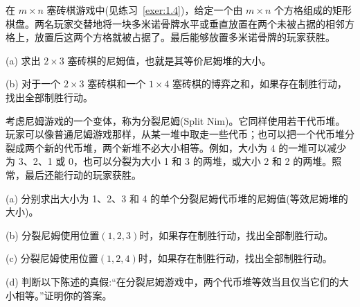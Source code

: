 \begin{exercise}\label{exer:1.11}
在 \(m \times  n\) 塞砖棋游戏中(见练习~\ref{exer:1.4})，给定一个由 \(m \times  n\) 个方格组成的矩形棋盘。两名玩家交替地将一块多米诺骨牌水平或垂直放置在两个未被占据的相邻方格上，放置后这两个方格就被占据了。最后能够放置多米诺骨牌的玩家获胜。

(a) 求出 \(2 \times  3\) 塞砖棋的尼姆值，也就是其等价尼姆堆的大小。

(b) 对于一个 \(2 \times  3\) 塞砖棋和一个 \(1 \times  4\) 塞砖棋的博弈之和，如果存在制胜行动，找出全部制胜行动。
\end{exercise}
\begin{exercise}\label{exer:1.12}
考虑尼姆游戏的一个变体，称为分裂尼姆(Split Nim)。它同样使用若干代币堆。玩家可以像普通尼姆游戏那样，从某一堆中取走一些代币；也可以把一个代币堆分裂成两个新的代币堆，两个新堆不必大小相等。例如，大小为 4 的一堆可以减少为 3、2、1 或 0，也可以分裂为大小 1 和 3 的两堆，或大小 2 和 2 的两堆。照常，最后还能行动的玩家获胜。

(a) 分别求出大小为 1、2、3 和 4 的单个分裂尼姆代币堆的尼姆值(等效尼姆堆的大小)。

(b) 分裂尼姆使用位置$(1,2,3)$时，如果存在制胜行动，找出全部制胜行动。

(c) 分裂尼姆使用位置$(1,2,4)$时，如果存在制胜行动，找出全部制胜行动。

(d) 判断以下陈述的真假:“在分裂尼姆游戏中，两个代币堆等效当且仅当它们的大小相等。”证明你的答案。
\end{exercise}
